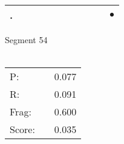 \documentclass[landscape]{article}
\newcommand{\ssp}{\hspace{2pt}}
\newcommand{\mex}{\cellcolor{g}$\bullet$}
\begin{document}
\begin{tabular}{|l|p{10pt}|p{10pt}|p{10pt}|p{10pt}|p{10pt}|p{10pt}|p{10pt}|p{10pt}|p{10pt}|p{10pt}|}
\hline
\ssp \cellcolor{ref9}. \ssp&\hspace{2pt}&\hspace{2pt}&\hspace{2pt}&\hspace{2pt}&\hspace{2pt}&\hspace{2pt}&\hspace{2pt}&\hspace{2pt}&\hspace{2pt}&\hspace{2pt}\mex\\
\hline
\end{tabular}

\vspace{6pt}
\noindent Segment 54\\\\
\noindent\begin{tabular}{lm{12pt}r}
\hline
P:&&0.077\\
R:&&0.091\\
Frag:&&0.600\\
Score:&&0.035\\
\end{tabular}

\newpage
\end{document}
